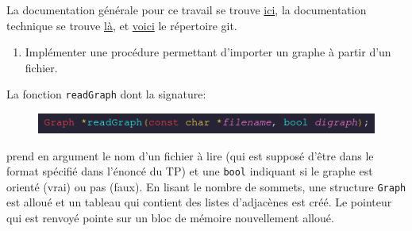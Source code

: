 \documentclass[10pt]{article} %
\begin{document}
\vspace{1cm}

La documentation générale pour ce travail se trouve \href{https://polytech-sorbonne-main-tp2.readthedocs.io/en/latest/}{ici}, la documentation
technique se trouve \href{https://ejovo13.github.io/DSA_TP1/}{là}, et \href{https://github.com/ejovo13/DSA_TP1}{voici} le répertoire git.

\vspace{1cm}
\noindent {} 

\begin{enumerate}
    \item Implémenter une procédure permettant d'importer un graphe à partir d'un fichier.
\end{enumerate}



La fonction \texttt{readGraph} dont la signature:
\begin{figure}[h!]
    \centering
    \includegraphics[height=.5cm]{media/readGraph.png}
\end{figure}

prend en argument le nom d'un fichier à lire (qui est supposé d'être dans le format spécifié dans l'énoncé du TP) et une
\texttt{bool} indiquant si le graphe est orienté (vrai) ou pas (faux). En lisant le nombre de sommets, une structure \texttt{Graph} est alloué
et un tableau qui contient des listes d'adjacènes est créé. Le pointeur qui est renvoyé pointe sur un bloc de mémoire nouvellement alloué.
\end{document}
